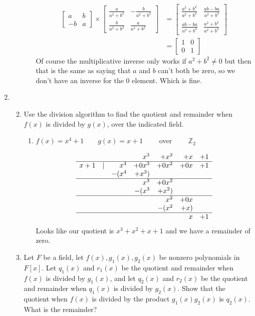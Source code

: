\documentclass[letterpaper]{article}
\begin{document}
\begin{enumerate}
\begin{enumerate}
\begin{enumerate}
\begin{align*}
        \left[\begin{array}{rr}a&b\\-b&a\end{array}\right]
        \times\left[\begin{array}{rr}\frac{a}{a^2+b^2}&-\frac{b}{a^2+b^2}\\\frac{b}{a^2+b^2}&\frac{a}{a^2+b^2}\end{array}\right]
        &=\left[\begin{array}{rr}\frac{a^2+b^2}{a^2+b^2}&\frac{ab-ba}{a^2+b^2}\\\frac{ab-ba}{a^2+b^2}&\frac{a^2+b^2}{a^2+b^2}\end{array}\right]\\
        &=\left[\begin{array}{rr}1&0\\0&1\end{array}\right]
      \end{align*}
      Of course the multiplicative inverse only works if $a^2+b^2\ne 0$ but then that is the same as saying that $a$ and $b$ can't both be zero, so we don't have an inverse for the $0$ element. Which is fine.
    \end{enumerate}
    \renewcommand{\labelenumiii}{(\alph{enumiii})}
  \end{enumerate}
\item
  \begin{enumerate}
  \setcounter{enumii}{1}
  \item
    Use the division algorithm to find the quotient and remainder when $f(x)$ is divided by $g(x)$, over the indicated field.
    \begin{enumerate}
    \item
      $f(x)=x^4+1\qquad g(x)=x+1\qquad$ over $\qquad\mathbb{Z}_2$

      \[
      \begin{array}{rrrrrrr}
      &&&x^3&+x^2&+x&+1\\
      \hline
      x+1&|&x^4&+0x^3&+0x^2&+0x&+1\\
      &&-(x^4&+x^3)\\
      \hline
      &&&x^3&+0x^2\\
      &&&-(x^3&+x^2)\\
      \hline
      &&&&x^2&+0x\\
      &&&&-(x^2&+x)\\
      \hline
      &&&&&x&+1
      \end{array}
      \]
      Looks like our quotient is $x^3+x^2+x+1$ and we have a remainder of zero.
    \end{enumerate}
  \setcounter{enumii}{7}
  \item
    Let $F$ be a field, let $f(x),g_1(x),g_2(x)$ be nonzero polynomials in $F[x]$. Let $q_1(x)$ and $r_1(x)$ be the quotient and remainder when $f(x)$ is divided by $g_1(x)$, and let $q_2(x)$ and $r_2(x)$ be the quotient and remainder when $q_1(x)$ is divided by $g_2(x)$. Show that the quotient when $f(x)$ is divided by the product $g_1(x)g_2(x)$ is $q_2(x)$. What is the remainder?


\end{enumerate}
\end{enumerate}
\end{document}

